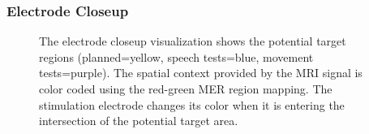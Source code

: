 \documentclass[review]{vgtc}                 %
\begin{document}
\subsubsection{Electrode Closeup}\label{sec:overview:placement:targetareaview}
\begin{figure}[t]
  \centering
  \caption{The electrode closeup visualization shows the potential target regions (planned=yellow, speech tests=blue, movement tests=purple). The spatial context provided by the MRI signal is color coded using the red-green MER region mapping. The stimulation electrode changes its color when it is entering the intersection of the potential target area.}
  \label{fig:targetregion}
\end{figure}
\end{document}
